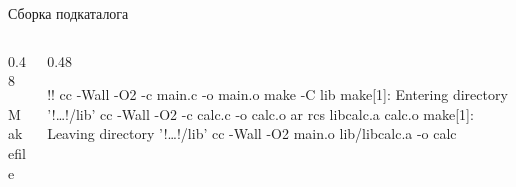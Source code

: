 \documentclass[compress, 8pt, aspectratio=169]{beamer}
\begin{document}
\begin{frame}[fragile]{Сборка подкаталога}

  \begin{columns}[T]

    \begin{column}{0.48\textwidth}

        {Makefile}

    \end{column}

    \begin{column}{0.48\textwidth}

      \begin{terminalwindow}
!!
cc -Wall -O2 -c main.c -o main.o
make -C lib
make[1]: Entering directory '!\dots!/lib'
cc -Wall -O2 -c calc.c -o calc.o
ar rcs libcalc.a calc.o
make[1]: Leaving directory '!\dots!/lib'
cc -Wall -O2 main.o lib/libcalc.a -o calc
      \end{terminalwindow}

    \end{column}

  \end{columns}

\end{frame}
\end{document}
